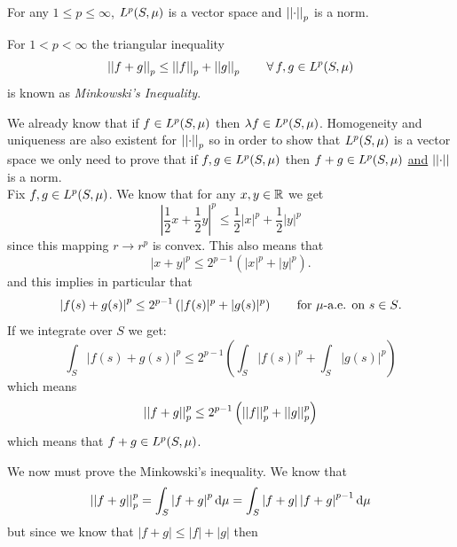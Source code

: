 \documentclass{article}
\begin{document}
\begin{theorem}
	For any $1\leq p\leq\infty$, $L^{p}(S,\mu)$ is a vector space and $\left|\left|\cdot\right|\right|_{p}$ is a norm.
\end{theorem}
\begin{remark}
	For $1<p<\infty$ the triangular inequality
	\begin{equation*}
		\left|\left|f+g\right|\right|_p\leq\left|\left|f\right|\right|_p+\left|\left|g\right|\right|_p\qquad\forall\, f,g\in L^{p}(S,\mu)
	\end{equation*}
	is known as \emph{Minkowski's Inequality}.
\end{remark}
\begin{fancyproof}
	We already know that if $f\in L^{p}(S,\mu)$ then $\lambda f\in L^{p}(S,\mu)$. Homogeneity and uniqueness are also existent for $\left|\left|\cdot\right|\right|_p$ so in order to show that $L^{p}(S,\mu)$ is a vector space we only need to prove that if $f,g\in L^{p}(S,\mu)$ then $f+g\in L^{p}(S,\mu)$ \underline{and} $\left|\left|\cdot\right|\right|$ is a norm. \\
	Fix $f,g\in L^{p}(S,\mu)$. We know that for any $x,y\in\mathbb{R}$ we get
	\begin{equation*}
		\left|\frac{1}{2}x+\frac{1}{2}y\right|^{p}\leq\frac{1}{2}|x|^p+\frac{1}{2}|y|^{p}
	\end{equation*}
	since this mapping $r\to r^p$ is convex. This also means that
	\begin{equation*}
		\left|x+y\right|^p\leq2^{p-1}\left(|x|^{p}+|y|^{p}\right).
	\end{equation*}
	and this implies in particular that
	\begin{equation*}
		\left|f(s)+g(s)\right|^{p}\leq2^{p-1}\left(|f(s)|^{p}+|g(s)|^{p}\right)\qquad\text{for $\mu$-a.e. on $s\in S$}.
	\end{equation*}
	If we integrate over $S$ we get:
	\begin{equation*}
		\int_S\left|f(s)+g(s)\right|^{p}\leq2^{p-1}\left(\int_S|f(s)|^{p}+\int_S|g(s)|^{p}\right)
	\end{equation*}
	which means 
	\begin{equation*}
		\left|\left|f+g\right|\right|_{p}^{p}\leq2^{p-1}\left(\left|\left|f\right|\right|^p_p+\left|\left|g\right|\right|^p_p\right)
	\end{equation*}
	which means that $f+g\in L^{p}(S,\mu)$. \par
	We now must prove the Minkowski's inequality. We know that
	\begin{equation*}
			\left|\left|f+g\right|\right|_{p}^{p}=\int_S\left|f+g\right|^{p}\mathop{}\!\mathrm{d}\mu=\int_S\left|f+g\right|\left|f+g\right|^{p-1}\mathop{}\!\mathrm{d}\mu
	\end{equation*}
	but since we know that $\left|f+g\right|\leq|f|+|g|$ then

\end{fancyproof}
\end{document}
